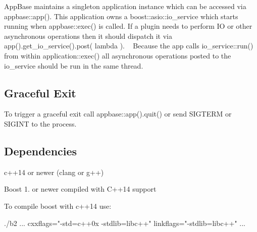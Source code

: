 App\+Base maintains a singleton {\ttfamily application} instance which can be accessed via {\ttfamily appbase\+::app()}. This application owns a {\ttfamily boost\+::asio\+::io\+\_\+service} which starts running when {\ttfamily appbase\+::exec()} is called. If a plugin needs to perform IO or other asynchronous operations then it should dispatch it via {\ttfamily app().get\+\_\+io\+\_\+service().post( lambda )}. ~\newline
 Because the app calls {\ttfamily io\+\_\+service\+::run()} from within {\ttfamily application\+::exec()} all asynchronous operations posted to the io\+\_\+service should be run in the same thread. ~\newline
 \subsection*{Graceful Exit}

To trigger a graceful exit call {\ttfamily appbase\+::app().quit()} or send S\+I\+G\+T\+E\+RM or S\+I\+G\+I\+NT to the process.

\subsection*{Dependencies}


\begin{DoxyEnumerate}
\item c++14 or newer (clang or g++)
\item Boost 1. or newer compiled with C++14 support
\end{DoxyEnumerate}

To compile boost with c++14 use\+:


\begin{DoxyCode}
./b2 ...  cxxflags="-std=c++0x -stdlib=libc++" linkflags="-stdlib=libc++" ...
\end{DoxyCode}
 